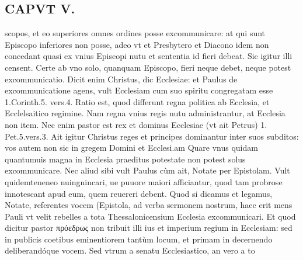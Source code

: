 \documentclass{article}
\begin{document}
\begin{pages}
\section*{CAPVT V. }
\marginpar{[ p.393 ]}\pstart scopos, et eo superiores omnes ordines posse excommunicare: at qui sunt Episcopo inferiores non posse, adeo vt et Presbytero et Diacono idem non concedant quasi ex vnius Episcopi nutu et sententia id fieri debeat. Sic igitur illi censent. Certe ab vno solo, quanquam Episcopo, fieri neque debet, neque potest excommunicatio. Dicit enim Christus, dic Ecclesiae: et Paulus de excommunicatione agens, vult Ecclesiam cum suo spiritu congregatam esse 1.Corinth.5. vers.4. Ratio est, quod differunt regna politica ab Ecclesia, et Ecclelsaitico regimine. Nam regna vnius regis nutu administrantur, at Ecclesia non item. Nec enim pastor est rex et dominus Ecclesiae (vt ait Petrus) 1. Pet.5.vers.3.  \pend\pstart Ait igitur Christus reges et principes dominantur inter suos subditos: vos autem non sic in gregem Domini et Ecclesi.am Quare vnus quidam quantumuis magna in Ecclesia praeditus potestate non potest solus excommunicare. Nec aliud sibi vult Paulus cùm ait, Notate per Epistolam. Vult quidemteneneo nuingnincari, ue puuore maiori afficiantur, quod tam probrose innotescant apud eum, quem reuereri debent. Quod si dicamus et legamus, Notate, referentes vocem (Epistola, ad verba sermonem nostrum, haec erit mens Pauli vt velit rebelles a tota Thessalonicensium Ecclesia excommunicari.  \pend\pstart Et quod dicitur pastor πρόεδρως non tribuit illi ius et imperium regium in Ecclesiam: sed in publicis coetibus eminentiorem tantùm locum, et primam in decernendo deliberandóque vocem. Sed vtrum a senatu Ecclesiastico, an vero a to\pend

\end{pages}
\end{document}
